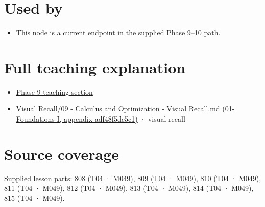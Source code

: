 \section{Used by}\label{appendix-d9f70bdfbc92-used-by}

\begin{itemize}
\tightlist
\item
  This node is a current endpoint in the supplied Phase 9--10 path.
\end{itemize}

\section{Full teaching explanation}\label{appendix-d9f70bdfbc92-full-teaching-explanation}

\begin{itemize}
\tightlist
\item
  \href{Continuous\%20Notes/Computing\%20Foundations\%20-\%20From\%20Bits\%20to\%20C++\%20and\%20Systems\%20APIs\#Functions,\%20limits,\%20continuity,\%20and\%20scalar\%20change}{Phase 9 teaching section}
\item
  \href{../01-Foundations-I/main.pdf\#nameddest=appendix-adf48f5dc5c1}{Visual Recall/09 - Calculus and Optimization - Visual Recall.md (01-Foundations-I, appendix-adf48f5dc5c1)} · visual recall
\end{itemize}

\section{Source coverage}\label{appendix-d9f70bdfbc92-source-coverage}

Supplied lesson parts: 808 (T04 · M049), 809 (T04 · M049), 810 (T04 · M049), 811 (T04 · M049), 812 (T04 · M049), 813 (T04 · M049), 814 (T04 · M049), 815 (T04 · M049).
